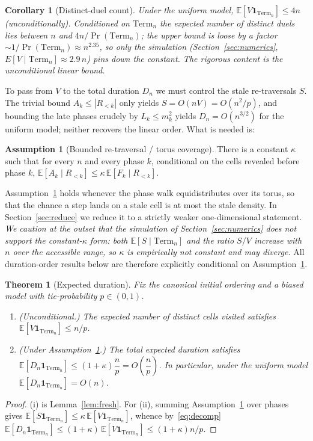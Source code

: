 \documentclass[11pt]{article}
\newtheorem{theorem}{Theorem}
\newtheorem{corollary}{Corollary}
\theoremstyle{definition}
\newtheorem{assumption}{Assumption}
\theoremstyle{remark}
\newcommand{\Term}{\mathrm{Term}}
\newcommand{\E}{\mathbb{E}}
\begin{document}
\begin{corollary}[Distinct-duel count]\label{cor:distinct}
Under the uniform model, $\E[V \mathbf 1_{\Term_n}] \le 4n$ (unconditionally). Conditioned on $\Term_n$ the expected
number of distinct duels lies between $n$ and $4n/\Pr(\Term_n)$; the upper bound is loose by a factor $\sim 1/\Pr(\Term_n)
\approx n^{2.35}$, so only the simulation (Section~\ref{sec:numerics}, $E[V \mid \Term_n] \approx 2.9\,n$) pins down the
constant. The rigorous content is the unconditional linear bound.
\end{corollary}

To pass from $V$ to the total duration $D_n$ we must control the stale re-traversals $S$. The trivial bound
$A_k \le |R_{<k}|$ only yields $S = O(nV) = O(n^2/p)$, and bounding the late phases crudely by $L_k \le m_k^2$ yields
$D_n = O(n^{3/2})$ for the uniform model; neither recovers the linear order. What is needed is:

\begin{assumption}[Bounded re-traversal / torus coverage]\label{asm:cover}
There is a constant $\kappa$ such that for every $n$ and every phase $k$, conditional on the cells revealed before phase
$k$, $\E[A_k \mid R_{<k}] \le \kappa\, \E[F_k \mid R_{<k}]$.
\end{assumption}

Assumption~\ref{asm:cover} holds whenever the phase walk equidistributes over its torus, so that the chance a step lands on
a stale cell is at most the stale density. In Section~\ref{sec:reduce} we reduce it to a strictly weaker one-dimensional
statement. \emph{We caution at the outset that the simulation of Section~\ref{sec:numerics} does not support the
constant-$\kappa$ form: both $\E[S \mid \Term_n]$ and the ratio $S/V$ \emph{increase} with $n$ over the accessible range,
so $\kappa$ is empirically not constant and may diverge.} All duration-order results below are therefore explicitly
conditional on Assumption~\ref{asm:cover}.

\begin{theorem}[Expected duration]\label{thm:dur}
Fix the canonical initial ordering and a biased model with tie-probability $p \in (0, 1)$.
\begin{enumerate}[label=(\roman*),nosep]
\item \emph{(Unconditional.)} The expected number of distinct cells visited satisfies $\E[V \mathbf 1_{\Term_n}] \le n/p$.
\item \emph{(Under Assumption~\ref{asm:cover}.)} The total expected duration satisfies
$\E[D_n \mathbf 1_{\Term_n}] \le (1 + \kappa)\dfrac{n}{p} = O\!\left(\dfrac{n}{p}\right)$. In particular, under the uniform
model $\E[D_n \mathbf 1_{\Term_n}] = O(n)$.
\end{enumerate}
\end{theorem}
\begin{proof}
(i) is Lemma~\ref{lem:fresh}. For (ii), summing Assumption~\ref{asm:cover} over phases gives
$\E[S \mathbf 1_{\Term_n}] \le \kappa\, \E[V \mathbf 1_{\Term_n}]$, whence by~\eqref{eq:decomp}
$\E[D_n \mathbf 1_{\Term_n}] \le (1 + \kappa)\,\E[V \mathbf 1_{\Term_n}] \le (1 + \kappa) n/p$.
\end{proof}
\end{document}
